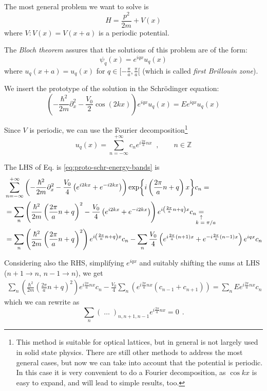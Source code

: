 The most general problem we want to solve is
$$H=\frac{p^2}{2m} + V(x)$$
where $V : V(x) = V(x+a)$ is a periodic potential.

The \textit{Bloch theorem} assures that the solutions of this problem are of the form:
$$\psi_q(x) = e^{iqx}u_q(x)$$
where $u_q(x+a) = u_q(x)$
for $q\in [-\frac{\pi}{a},\frac{\pi}{a}[$ (which is called \textit{first Brillouin zone}).


\noindent We insert the prototype of the solution in the Schrödinger equation:
\begin{equation}
\label{eq:proto-schr-energy-bands}
\left(
    -\frac{\hbar^2}{2m}\partial^2_x -\frac{V_0}{2}\cos(2kx)
\right)
e^{iqx} u_q(x)
= E e^{iqx} u_q(x)
\end{equation}

\noindent Since $V$ is periodic, we can use the Fourier decomposition\footnote{
This method is suitable for optical lattices, but in general is not largely used in solid state physics. There are still other methods to address the most general cases, but now we can take into account that the potential is periodic. In this case it is very convenient to do a Fourier decomposition, as $\cos kx$ is easy to expand, and will lead to simple results, too.}
\begin{equation*}
    u_q(x)=\sum_{n=-\infty}^{+\infty}
    c_n e^{i\frac{2\pi}{a}nx}
    \;\;, \qquad n \in \mathbb{Z}
\end{equation*}

\noindent The LHS of Eq. is \ref{eq:proto-schr-energy-bands} is
\begin{align*}
&\sum_{n=-\infty}^{+\infty}
\left(
    -\frac{\hbar^2}{2m}\partial^2_x -\frac{V_0}{4}
    \left(e^{i2kx} + e^{-i2kx}\right)
\right)
\exp{i\left(\frac{2\pi}{a}n+q\right)x} c_n =\\
& =\sum_{n} \left(
    \frac{\hbar^2}{2m}
    \left(\frac{2\pi}{a}n+q\right)^2
    -\frac{V_0}{4}
    \left(e^{i2kx} + e^{-i2kx}\right)
\right)
e^{i\left(\frac{2\pi}{a}n+q\right)x} c_n 
\equalexpl{$k=\pi/a$} \\
& = \sum_{n} \left(
    \frac{\hbar^2}{2m}\left(\frac{2\pi}{a}n+q\right)^2
\right) e^{i\left(\frac{2\pi}{a}n+q\right)x} c_n
-
\sum_{n} \frac{V_0}{4} \left(
    e^{i\frac{2\pi}{a}(n+1)x}
    + e^{-i\frac{2\pi}{a}(n-1)x}
\right) e^{iqx} c_n
\end{align*}


\noindent Considering also the RHS, simplifying $e^{iqx}$ and suitably shifting the sums at LHS ($n+1\rightarrow n$, $n-1 \rightarrow n$), we get
\begin{align*}
\sum_{n} \left(
    \frac{\hbar^2}{2m}\left(\frac{2\pi}{a}n+q\right)^2
\right) e^{i\frac{2\pi}{a}nx} c_n
-
\frac{V_0}{4} \sum_{n}  \left(
    e^{i\frac{2\pi}{a}nx}
    \left( c_{n-1} + c_{n+1} \right)
\right) =
\sum_{n} E e^{i\frac{2\pi}{a}nx} c_n
\end{align*}
which we can rewrite as
\begin{equation*}
\sum_{n}
\left( \; \dots \; \right)
 _{n, n+1, n-1}
 e^{i\frac{2\pi}{a}nx} = 0 \:\:.
\end{equation*}

